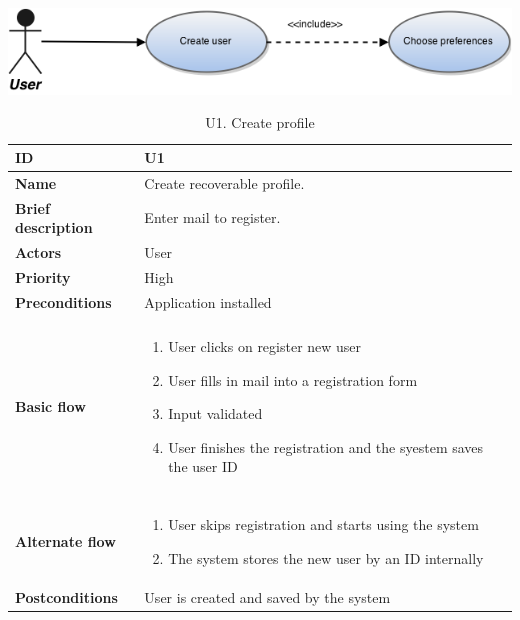 \begin{table}[htp]
	\includegraphics[width=\textwidth]{fig/U1}
	\centering
	\caption{U1. Create profile}
	\begin{tabular}[b]{|l | l|}\hline
		\textbf{ID} 				& U1									\\\hline
		\textbf{Name} 				& Create recoverable profile.			\\\hline
		\textbf{Brief description}	& Enter mail to register. 				\\\hline
		\textbf{Actors} 			& User									\\\hline
		\textbf{Priority}			& High									\\\hline
		\textbf{Preconditions}		& Application installed					\\\hline&\\[-2ex]
		\textbf{Basic flow}			& \begin{minipage}{5in}
									  \begin{enumerate}[noitemsep]
										\item User clicks on register new user
										\item User fills in mail into a registration form
										\item Input validated
										\item User finishes the registration and the syestem saves the user ID
									  \end{enumerate}						
									  \end{minipage}						\\\hline&\\[-2ex]
		\textbf{Alternate flow}		& \begin{minipage}{5in}
									  \begin{enumerate}[noitemsep]
										\item User skips registration and starts using the system
										\item The system stores the new user by an ID internally
									  \end{enumerate}
									 \end{minipage}							\\\hline
		\textbf{Postconditions}		& User is created and saved by the system\\\hline
	\end{tabular}
\end{table}

